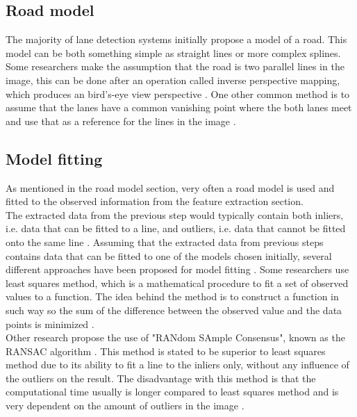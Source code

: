 \subsection{Road model}
The majority of lane detection systems initially propose a model of a road. This model can be both something simple as straight lines or more complex splines. Some researchers make the assumption that the road is two parallel lines in the image, this can be done after an operation called inverse perspective mapping, which produces an bird's-eye view  perspective \cite{bertozzi1998gold}. One other common method is to assume that the lanes have a common vanishing point where the both lanes meet and use that as a reference for the lines in the image \cite{Yenikaya:2013:KVR:2522968.2522970}\cite{jingyu2013lane}.

\subsection{Model fitting}
As mentioned in the road model section, very often a road model is used and fitted to the observed information from the feature extraction section.\\

The extracted data from the previous step would typically contain both inliers, i.e. data that can be fitted to a line, and outliers, i.e. data that cannot be fitted onto the same line \cite{raguram2008comparative}. Assuming that the extracted data from previous steps contains data that can be fitted to one of the models chosen initially, several different approaches have been proposed for model fitting \cite{BarHillel2014}. Some researchers use least squares method, which is a mathematical procedure to fit a set of observed values to a function. The idea behind the method is to construct a function in such way so the sum of the difference between the observed value and the data points is minimized \cite{LS}.\\

Other research propose the use of "RANdom SAmple Consensus", known as the RANSAC algorithm \cite{huang2009finding}\cite{aly2008real} \cite{li2013lane}. This method is stated to be superior to least squares method due to its ability to fit a line to the inliers only, without any influence of the outliers on the result. The disadvantage with this method is that the computational time usually is longer compared to least squares method and is very dependent on the amount of outliers in the image \cite{RANSAC}.


